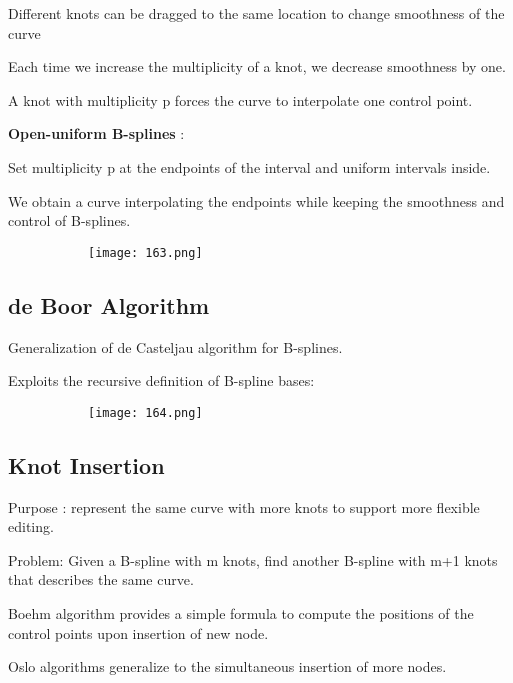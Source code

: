 \documentclass{article}
\begin{document}
Different knots can be dragged to the same location to change smoothness of the curve

Each time we increase the multiplicity of a knot, we decrease smoothness by one.

A knot with multiplicity p forces the curve to interpolate one control point.

\textbf{Open-uniform B-splines} :

Set multiplicity p at the endpoints of the interval and uniform intervals inside.

We obtain a curve interpolating the endpoints while keeping the smoothness and control of B-splines.

    \begin{figure}[ht!]
  \centering
  \begin{subfigure}[b]{0.4\linewidth}
    \texttt{[image: 163.png]}
  \end{subfigure}
\end{figure}

\subsection{de Boor Algorithm}

Generalization of de Casteljau algorithm for B-splines.

Exploits the recursive definition of B-spline bases:



    \begin{figure}[ht!]
  \centering
  \begin{subfigure}[b]{0.7\linewidth}
    \texttt{[image: 164.png]}
  \end{subfigure}
\end{figure}

\subsection{Knot Insertion}

Purpose : represent the same curve with more knots to support more flexible editing.

Problem: Given a B-spline with m knots, find another B-spline with m+1 knots that describes the same curve.

Boehm algorithm provides a simple formula to compute the positions of the control points upon insertion of new node.

Oslo algorithms generalize to the simultaneous insertion of more nodes.
\end{document}
